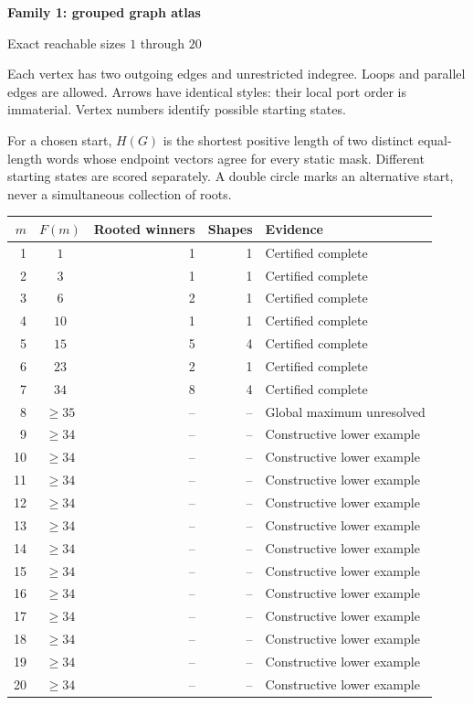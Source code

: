 \documentclass[11pt,a4paper]{article}
\begin{document}
{\LARGE\bfseries Family 1: grouped graph atlas}\par\vspace{3mm}
{\large Exact reachable sizes $1$ through $20$}\par\vspace{4mm}
Each vertex has two outgoing edges and unrestricted indegree. Loops and parallel edges are allowed. Arrows have identical styles: their local port order is immaterial. Vertex numbers identify possible starting states.\par\vspace{2mm}
For a chosen start, $H(G)$ is the shortest positive length of two distinct equal-length words whose endpoint vectors agree for every static mask. Different starting states are scored separately. A double circle marks an alternative start, never a simultaneous collection of roots.\par\vspace{3mm}
\begin{center}\small\begin{tabular}{rcrrl}\toprule $m$ & $F(m)$ & Rooted winners & Shapes & Evidence \\\midrule
1 & $1$ & 1 & 1 & Certified complete \\
2 & $3$ & 1 & 1 & Certified complete \\
3 & $6$ & 2 & 1 & Certified complete \\
4 & $10$ & 1 & 1 & Certified complete \\
5 & $15$ & 5 & 4 & Certified complete \\
6 & $23$ & 2 & 1 & Certified complete \\
7 & $34$ & 8 & 4 & Certified complete \\
8 & $\ge35$ & -- & -- & Global maximum unresolved \\
9 & $\ge34$ & -- & -- & Constructive lower example \\
10 & $\ge34$ & -- & -- & Constructive lower example \\
11 & $\ge34$ & -- & -- & Constructive lower example \\
12 & $\ge34$ & -- & -- & Constructive lower example \\
13 & $\ge34$ & -- & -- & Constructive lower example \\
14 & $\ge34$ & -- & -- & Constructive lower example \\
15 & $\ge34$ & -- & -- & Constructive lower example \\
16 & $\ge34$ & -- & -- & Constructive lower example \\
17 & $\ge34$ & -- & -- & Constructive lower example \\
18 & $\ge34$ & -- & -- & Constructive lower example \\
19 & $\ge34$ & -- & -- & Constructive lower example \\
20 & $\ge34$ & -- & -- & Constructive lower example \\
\bottomrule\end{tabular}\end{center}\vspace{2mm}
\end{document}
